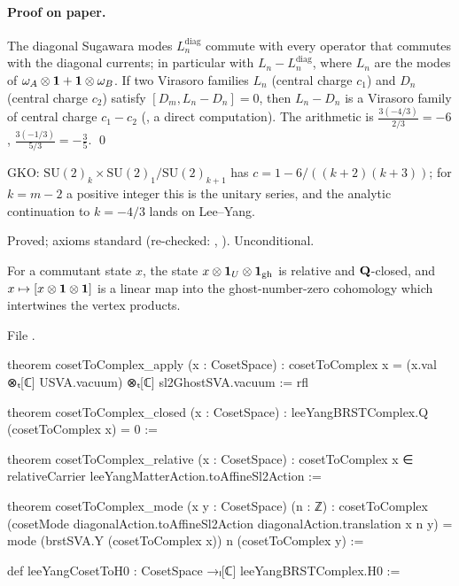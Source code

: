 \paragraph{Proof on paper.} The diagonal Sugawara modes $L^{\mathrm{diag}}_n$ commute with every operator that commutes with the diagonal
currents; in particular with $L_n-L^{\mathrm{diag}}_n$, where $L_n$ are the modes of $\omega_A\otimes\mathbf 1+\mathbf 1\otimes\omega_B$.
If two Virasoro families $L_n$ (central charge $c_1$) and $D_n$ (central charge $c_2$) satisfy $[D_m,L_n-D_n]=0$, then $L_n-D_n$ is a Virasoro
family of central charge $c_1-c_2$ (, a direct computation). The arithmetic is
$\tfrac{3(-4/3)}{2/3}=-6$, $\tfrac{3(-1/3)}{5/3}=-\tfrac35$. \qed

\begin{physics}
GKO: $\mathrm{SU}(2)_{k}\times\mathrm{SU}(2)_1/\mathrm{SU}(2)_{k+1}$ has $c=1-6/((k+2)(k+3))$; for $k=m-2$ a positive integer this is the
unitary series, and the analytic continuation to $k=-4/3$ lands on Lee--Yang.
\end{physics}

\begin{status}
Proved; axioms standard (re-checked: , ). Unconditional.
\end{status}

\begin{theorem}\label{l28:thm:cosetmap}
For a commutant state $x$, the state $x\otimes\mathbf 1_U\otimes\mathbf 1_{\mathrm{gh}}$ is relative and $\mathbf Q$-closed, and
$x\mapsto[x\otimes\mathbf 1\otimes\mathbf 1]$ is a linear map into the ghost-number-zero cohomology which intertwines the vertex
products.
\end{theorem}

\noindent File .
\begin{leancode}
theorem cosetToComplex_apply (x : CosetSpace) :
    cosetToComplex x = (x.val ⊗ₜ[ℂ] USVA.vacuum) ⊗ₜ[ℂ] sl2GhostSVA.vacuum := rfl

theorem cosetToComplex_closed (x : CosetSpace) : leeYangBRSTComplex.Q (cosetToComplex x) = 0 :=

theorem cosetToComplex_relative (x : CosetSpace) :
    cosetToComplex x ∈ relativeCarrier leeYangMatterAction.toAffineSl2Action :=

theorem cosetToComplex_mode (x y : CosetSpace) (n : ℤ) :
    cosetToComplex (cosetMode diagonalAction.toAffineSl2Action diagonalAction.translation x n y) =
      mode (brstSVA.Y (cosetToComplex x)) n (cosetToComplex y) :=

def leeYangCosetToH0 : CosetSpace →ₗ[ℂ] leeYangBRSTComplex.H0 :=
\end{leancode}

